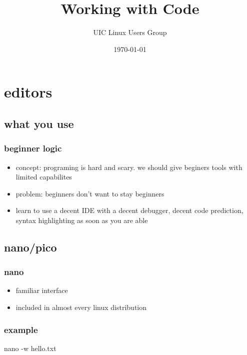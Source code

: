 \documentclass[hyperref={pdfpagelabels=false}]{beamer}
\title{Working with Code}
\author{UIC Linux Users Group}
\date{\today}
\begin{document}
\frame{\titlepage}
\section[outline]{}
\frame{\tableofcontents}
\section{editors}
	\subsection{what you use}
	\frame
	{
	    \frametitle{beginner logic}
	    \begin{itemize}
	    \item{concept: programing is hard and scary. we should give beginers tools with limited capabilites}
	    \item{problem: beginners don't want to stay beginners}
	    \item{learn to use a decent IDE with a decent debugger, decent code prediction, syntax highlighting as soon as you are able}
	    \end{itemize}
	}
	\subsection{nano/pico}
		\frame
		{
		    \frametitle{nano}
		    \begin{itemize}
		    \item{familiar interface}
		    \item{included in almost every linux distribution}
		    \end{itemize}
		}
		\frame
		{
		    \frametitle{example}
		    nano -w hello.txt
		}
\end{document}
